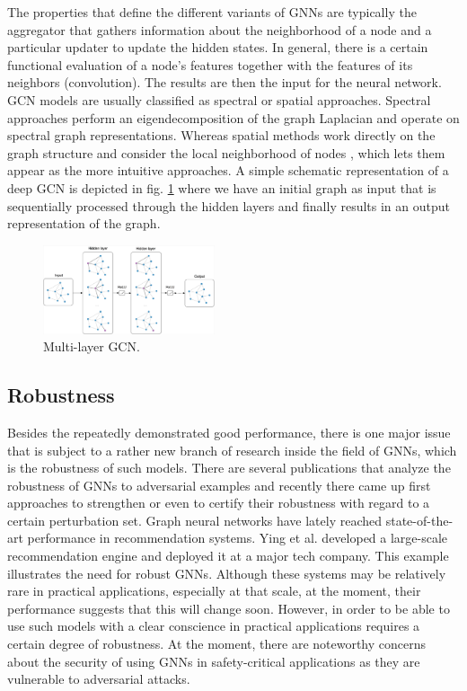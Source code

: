 \documentclass[a4paper,preprint]{sig-alternate}
\begin{document}
The properties that define the different variants of GNNs are typically the aggregator that gathers 
information about the neighborhood of a node and a particular updater to update the hidden states. \cite{Zhou_2019}
In general, there is a certain functional evaluation of a node's features together with the features of its neighbors (convolution). 
The results are then the input for the neural network. GCN models are usually classified as spectral or spatial approaches.
Spectral approaches perform an eigendecomposition of the graph Laplacian and operate on spectral graph representations. \cite{Zhou_2019}
Whereas spatial methods work directly on the graph structure and consider the local neighborhood of nodes \cite{Zhou_2019},
which lets them appear as the more intuitive approaches.
A simple schematic representation of a deep GCN is depicted in fig. \ref{fig:gcn} where we have an initial graph as input
that is sequentially processed through the hidden layers and finally results in an output representation of the graph.
\begin{figure}[h]
    \centering
    \includegraphics[width=0.45\textwidth]{img/gcn.png}
    \caption{Multi-layer GCN. \cite{Kipf_2016}}
    \label{fig:gcn}
\end{figure}

\subsection{Robustness}

Besides the repeatedly demonstrated good performance, there is one major issue that is subject to a rather new branch of 
research inside the field of GNNs, which is the robustness of such models. There are several publications that analyze 
the robustness of GNNs to adversarial examples and recently there came up first approaches to strengthen
or even to certify their robustness with regard to a certain perturbation set.\newline
Graph neural networks have lately reached state-of-the-art performance in recommendation systems. \cite{Ying_2018}
Ying et al. developed a large-scale recommendation engine and deployed it at a major tech company.
This example illustrates the need for robust GNNs. Although these systems may be relatively rare in practical applications, especially at
that scale, at the moment, their performance suggests that this will change soon. However, in order to be able to use such models
with a clear conscience in practical applications requires a certain degree of robustness.
At the moment, there are noteworthy concerns about the security of using GNNs in safety-critical applications as they are
vulnerable to adversarial attacks. \cite{Jin_2020_Graph}\newline
\end{document}
